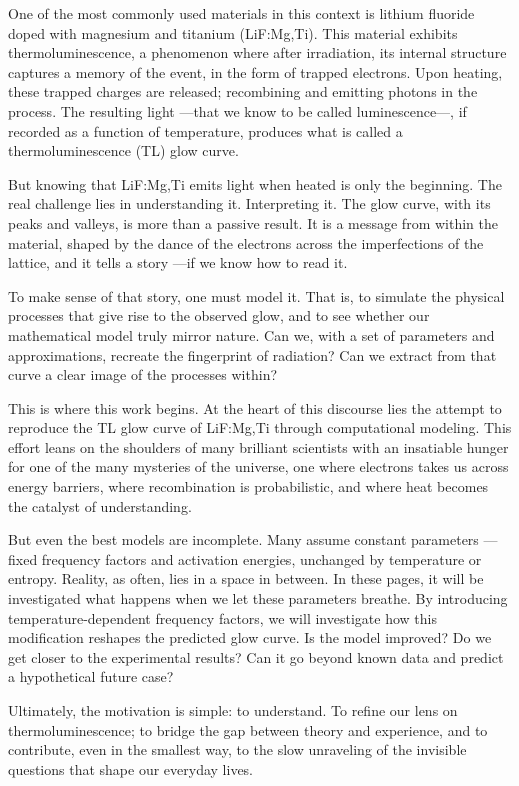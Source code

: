 \vspace{10pt}

One of the most commonly used materials in this context is lithium fluoride doped with magnesium and titanium (LiF:Mg,Ti). This material exhibits thermoluminescence, a phenomenon where after irradiation, its internal structure captures a memory of the event, in the form of trapped electrons. Upon heating, these trapped charges are released; recombining and emitting photons in the process. The resulting light ---that we know to be called luminescence---, if recorded as a function of temperature, produces what is called a thermoluminescence (TL) glow curve. %

But knowing that LiF:Mg,Ti emits light when heated is only the beginning. The real challenge lies in understanding it. Interpreting it. The glow curve, with its peaks and valleys, is more than a passive result. It is a message from within the material, shaped by the dance of the electrons across the imperfections of the lattice, and it tells a story ---if we know how to read it.

\vspace{10pt}

To make sense of that story, one must model it. That is, to simulate the physical processes that give rise to the observed glow, and to see whether our mathematical model truly mirror nature. Can we, with a set of parameters and approximations, recreate the fingerprint of radiation? Can we extract from that curve a clear image of the processes within?

\vspace{10pt}

This is where this work begins. At the heart of this discourse lies the attempt to reproduce the TL glow curve of LiF:Mg,Ti through computational modeling. This effort leans on the shoulders of many brilliant scientists with an insatiable hunger for one of the many mysteries of the universe, one where electrons takes us across energy barriers, where recombination is probabilistic, and where heat becomes the catalyst of understanding.

\vspace{10pt}

But even the best models are incomplete. Many assume constant parameters ---fixed frequency factors and activation energies, unchanged by temperature or entropy. Reality, as often, lies in a space in between. In these pages, it will be investigated what happens when we let these parameters breathe. By introducing temperature-dependent frequency factors, we will investigate how this modification reshapes the predicted glow curve. Is the model improved? Do we get closer to the experimental results? Can it go beyond known data and predict a hypothetical future case?


\vspace{10pt}

Ultimately, the motivation is simple: to understand. To refine our lens on thermoluminescence; to bridge the gap between theory and experience, and to contribute, even in the smallest way, to the slow unraveling of the invisible questions that shape our everyday lives.

